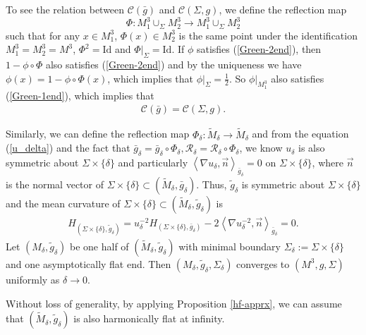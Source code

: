 \documentclass[letter]{amsart}
\theoremstyle{definition}
\theoremstyle{remark}
\begin{document}
To see the relation between $\mathcal{C}(\bar{g})$ and $\mathcal{C}(\Sigma, g)$, we define the reflection map 
$$
\Phi : M_1^3 \cup _{\Sigma} M_2^3 \to M_1^3 \cup _{\Sigma} M_2^3
$$ 
such that for any $x \in M_1^3$, $\Phi (x) \in M_2^3$ is the same point under the identification $M_1^3 = M_2^3 = M^3$, $\Phi ^2 = \mathrm{Id}$ and $\Phi |_{\Sigma} = \mathrm{Id}$. If $\phi $ satisfies (\ref{Green-2end}), then $1- \phi \circ \Phi $ also satisfies (\ref{Green-2end}) and by the uniqueness we have $\phi (x) = 1- \phi \circ \Phi (x)$, which implies that $\phi |_{\Sigma} = \frac{1}{2}$. So $\phi |_{M_{1}^3} $ also satisfies (\ref{Green-1end}), which implies that 
\begin{align}
\mathcal{C}(\bar{g}) =  \mathcal{C}(\Sigma, g).
\end{align}

Similarly, we can define the reflection map $\Phi _\delta : \tilde{M}_\delta \to \tilde{M}_\delta $ and from the equation (\ref{u_delta}) and the fact that $\bar{g}_\delta = \bar{g}_\delta \circ \Phi _\delta, \mathcal{R}_\delta = \mathcal{R}_\delta \circ \Phi _\delta  $, we know $u_\delta $ is also symmetric about $\Sigma \times \{\delta \} $ and particularly $\left<\nabla u_\delta , \vec{n} \right>_{\bar{g}_\delta } =0$ on $\Sigma \times \{\delta \} $, where $\vec{n}$ is the normal vector of $\Sigma \times \{\delta \} \subset (\tilde{M}_\delta , \bar{g}_\delta )$. Thus, $\tilde{g}_\delta $ is symmetric about $\Sigma \times \{\delta \} $ and the mean curvature of $\Sigma \times \{\delta \} \subset (\tilde{M}_\delta , \tilde{g}_\delta )$ is
\begin{align*}
	H_{(\Sigma \times \{\delta \} , \tilde{g}_\delta )} = u_\delta ^{-2} H_{(\Sigma \times \{\delta \} , \bar{g}_\delta )} - 2 \left< \nabla u_\delta ^{-2}, \vec{n} \right>_{\bar{g}_\delta } = 0.
\end{align*}
Let $(M_{\delta}, \tilde{g}_\delta )$ be one half of $(\tilde{M}_{\delta }, \tilde{g}_\delta )$ with minimal boundary $\Sigma_{\delta }:=\Sigma \times \{\delta \} $ and one asymptotically flat end. Then $(M_{\delta}, \tilde{g}_\delta, \Sigma_\delta )$ converges to $(M^3, g, \Sigma)$ uniformly as $\delta \to 0$. 

Without loss of generality, by applying Proposition \ref{hf-apprx}, we can assume that $(\tilde{M}_{\delta }, \tilde{g}_\delta )$ is also harmonically flat at infinity.
\end{document}
